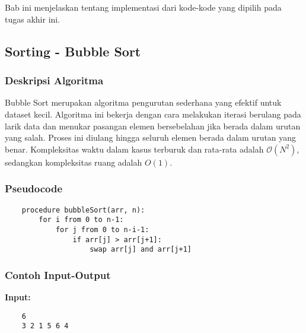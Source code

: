 \chapter{\babEmpat}
\label{bab:4}
Bab ini menjelaskan tentang implementasi dari kode-kode yang dipilih pada tugas akhir ini.



\section{Sorting - Bubble Sort}
\label{sec:bubble-sort-implementation}
\subsection{Deskripsi Algoritma}
Bubble Sort merupakan algoritma pengurutan sederhana yang efektif untuk dataset kecil. Algoritma ini bekerja dengan cara melakukan iterasi berulang pada larik data dan menukar pasangan elemen bersebelahan jika berada dalam urutan yang salah. Proses ini diulang hingga seluruh elemen berada dalam urutan yang benar. Kompleksitas waktu dalam kasus terburuk dan rata-rata adalah $\mathcal{O}\left(N^2\right)$, sedangkan kompleksitas ruang adalah ${O}\left(1\right)$.

\subsection{Pseudocode}
\begin{verbatim}
    procedure bubbleSort(arr, n):
        for i from 0 to n-1:
            for j from 0 to n-i-1:
                if arr[j] > arr[j+1]:
                    swap arr[j] and arr[j+1]
\end{verbatim}

\subsection{Contoh Input-Output}
\textbf{Input:}
\begin{verbatim}
    6
    3 2 1 5 6 4
\end{verbatim}

